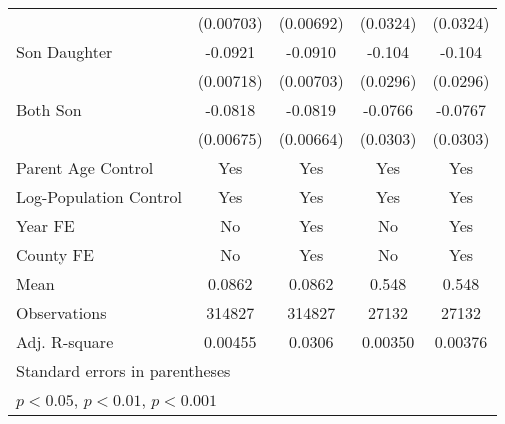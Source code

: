\begin{table}[htbp]
{\begin{tabular}{l*{4}{c}}
                                                    & (0.00703)                            & (0.00692)                            & (0.0324)                & (0.0324)                \\
            Son Daughter                            & -0.0921\sym{***}                     & -0.0910\sym{***}                     & -0.104\sym{***}         & -0.104\sym{***}         \\
                                                    & (0.00718)                            & (0.00703)                            & (0.0296)                & (0.0296)                \\
            Both Son                                & -0.0818\sym{***}                     & -0.0819\sym{***}                     & -0.0766\sym{*}          & -0.0767\sym{*}          \\
                                                    & (0.00675)                            & (0.00664)                            & (0.0303)                & (0.0303)                \\
            Parent Age Control                      & Yes                                  & Yes                                  & Yes                     & Yes                     \\
            Log-Population Control                  & Yes                                  & Yes                                  & Yes                     & Yes                     \\
            Year FE                                 & No                                   & Yes                                  & No                      & Yes                     \\
            County FE                               & No                                   & Yes                                  & No                      & Yes                     \\
            \midrule
            Mean                                    & 0.0862                               & 0.0862                               & 0.548                   & 0.548                   \\
            Observations                            & 314827                               & 314827                               & 27132                   & 27132                   \\
            Adj. R-square                           & 0.00455                              & 0.0306                               & 0.00350                 & 0.00376                 \\
            \bottomrule
            \multicolumn{5}{l}{\footnotesize Standard errors in parentheses}                                                                                                          \\
            \multicolumn{5}{l}{\footnotesize \sym{*} \(p<0.05\), \sym{**} \(p<0.01\), \sym{***} \(p<0.001\)}                                                                          \\
        \end{tabular}
    }
\end{table}